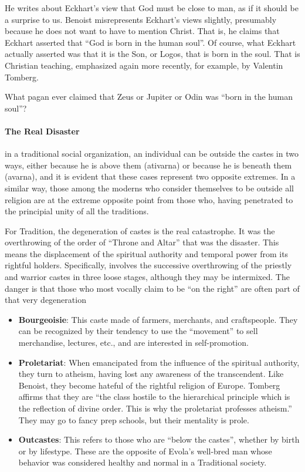 He writes about Eckhart's view that God must be close to man, as if it should be a surprise to us. Benoist misrepresents Eckhart's views slightly, presumably because he does not want to have to mention Christ. That is, he claims that Eckhart asserted that ``God is born in the human soul''. Of course, what Eckhart actually asserted was that it is the Son, or Logos, that is born in the soul. That is Christian teaching, emphasized again more recently, for example, by Valentin Tomberg.

What pagan ever claimed that Zeus or Jupiter or Odin was ``born in the human soul''?

\paragraph{The Real Disaster}


\begin{quotex}
in a traditional social organization, an individual can be outside the castes in two ways, either because he is above them (ativarna) or because he is beneath them (avarna), and it is evident that these cases represent two opposite extremes. In a similar way, those among the moderns who consider themselves to be outside all religion are at the extreme opposite point from those who, having penetrated to the principial unity of all the traditions.
\end{quotex}


For Tradition, the degeneration of castes is the real catastrophe. It was the overthrowing of the order of ``Throne and Altar'' that was the disaster. This means the displacement of the spiritual authority and temporal power from its rightful holders. Specifically, involves the successive overthrowing of the priestly and warrior castes in three loose stages, although they may be intermixed. The danger is that those who most vocally claim to be ``on the right'' are often part of that very degeneration

\begin{itemize}


\item \textbf{Bourgeoisie}: This caste made of farmers, merchants, and craftspeople. They can be recognized by their tendency to use the ``movement'' to sell merchandise, lectures, etc., and are interested in self-promotion.

\item \textbf{Proletariat}: When emancipated from the influence of the spiritual authority, they turn to atheism, having lost any awareness of the transcendent. Like Benoist, they become hateful of the rightful religion of Europe. Tomberg affirms that they are ``the class hostile to the hierarchical principle which is the reflection of divine order. This is why the proletariat professes atheism.'' They may go to fancy prep schools, but their mentality is prole.

\item \textbf{Outcastes}: This refers to those who are ``below the castes'', whether by birth or by lifestype. These are the opposite of Evola's well-bred man whose behavior was considered healthy and normal in a Traditional society.
\end{itemize}


